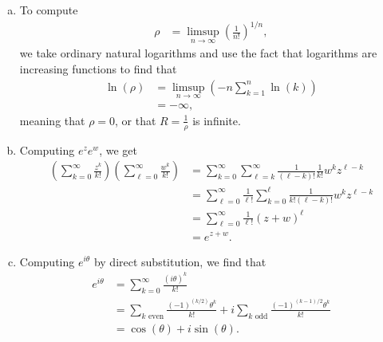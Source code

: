 \documentclass[10pt]{mypackage}
\begin{document}
\begin{solution}\hfill
  \begin{enumerate}[(a)]
    \item To compute
      \begin{align*}
        \rho &= \limsup_{n\rightarrow\infty} \left( \frac{1}{n!} \right)^{1/n},
      \end{align*}
      we take ordinary natural logarithms and use the fact that logarithms are increasing functions to find that
      \begin{align*}
        \ln\left( \rho \right) &= \limsup_{n\rightarrow\infty} \left( -n\sum_{k=1}^{n}\ln\left( k \right) \right)\\
                               &= -\infty,
      \end{align*}
      meaning that $\rho = 0$, or that $R = \frac{1}{\rho}$ is infinite.
    \item Computing $e^{z}e^{w}$, we get
      \begin{align*}
        \left( \sum_{k=0}^{\infty}\frac{z^{k}}{k!} \right)\left( \sum_{\ell = 0}^{\infty}\frac{w^{k}}{k!} \right) &= \sum_{k=0}^{\infty}\sum_{\ell = k}^{\infty} \frac{1}{\left( \ell - k \right)!}\frac{1}{k!}w^{k}z^{\ell - k}\\
                                                                                                                  &= \sum_{\ell = 0}^{\infty} \frac{1}{\ell!} \sum_{k=0}^{\ell} \frac{1}{k!\left( \ell-k \right)!} w^{k}z^{\ell - k}\\
                                                                                                                  &= \sum_{\ell = 0}^{\infty} \frac{1}{\ell!} \left( z+w \right)^{\ell}\\
                                                                                                                  &= e^{z+w}.
      \end{align*}
    \item Computing $e^{i\theta}$ by direct substitution, we find that
      \begin{align*}
        e^{i\theta} &= \sum_{k=0}^{\infty} \frac{\left( i\theta \right)^{k}}{k!}\\
                    &= \sum_{k\text{ even}} \frac{\left( -1 \right)^{(k/2)}\theta^{k}}{k!} + i\sum_{k\text{ odd}} \frac{\left( -1 \right)^{\left( k-1 \right)/2}\theta^{k}}{k!}\\
                    &= \cos\left( \theta \right) + i\sin\left( \theta \right).
      \end{align*}
  \end{enumerate}
\end{solution}
\end{document}
